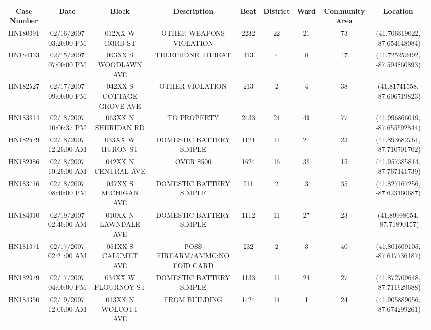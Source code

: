 \documentclass{article} %
\begin{document}
\begin{table}[h]
\centering
\begin{adjustbox}{width=\textwidth}
\begin{tabular}{ccccccccc}
  \hline
Case Number & Date & Block & Description & Beat & District & Ward & Community Area & Location \\ 
  \hline
HN180091 & 02/16/2007 03:20:00 PM & 012XX W 103RD ST & OTHER WEAPONS VIOLATION & 2232 &  22 &  21 &  73 & (41.706819022, -87.654048084) \\ 
  HN184333 & 02/15/2007 07:00:00 PM & 093XX S WOODLAWN AVE & TELEPHONE THREAT & 413 &   4 &   8 &  47 & (41.725252492, -87.594860893) \\ 
  HN182527 & 02/17/2007 09:00:00 PM & 042XX S COTTAGE GROVE AVE & OTHER VIOLATION & 213 &   2 &   4 &  38 & (41.81741558, -87.606719823) \\ 
  HN183814 & 02/18/2007 10:06:37 PM & 063XX N SHERIDAN RD & TO PROPERTY & 2433 &  24 &  49 &  77 & (41.996866019, -87.655592844) \\ 
  HN182579 & 02/18/2007 12:20:00 AM & 033XX W HURON ST & DOMESTIC BATTERY SIMPLE & 1121 &  11 &  27 &  23 & (41.893682761, -87.710701702) \\ 
  HN182986 & 02/18/2007 10:20:00 AM & 042XX N CENTRAL AVE & OVER \$500 & 1624 &  16 &  38 &  15 & (41.957385814, -87.767141739) \\ 
  HN183716 & 02/18/2007 08:40:00 PM & 037XX S MICHIGAN AVE & DOMESTIC BATTERY SIMPLE & 211 &   2 &   3 &  35 & (41.827167256, -87.623160687) \\ 
  HN184010 & 02/19/2007 02:40:00 AM & 010XX N LAWNDALE AVE & DOMESTIC BATTERY SIMPLE & 1112 &  11 &  27 &  23 & (41.89998654, -87.71890157) \\ 
  HN181071 & 02/17/2007 02:21:00 AM & 051XX S CALUMET AVE & POSS FIREARM/AMMO:NO FOID CARD & 232 &   2 &   3 &  40 & (41.801609105, -87.617736187) \\ 
  HN182079 & 02/17/2007 04:00:00 PM & 034XX W FLOURNOY ST & DOMESTIC BATTERY SIMPLE & 1133 &  11 &  24 &  27 & (41.872709648, -87.711929688) \\ 
  HN184350 & 02/19/2007 12:00:00 AM & 013XX N WOLCOTT AVE & FROM BUILDING & 1424 &  14 &   1 &  24 & (41.905889056, -87.674299261) \\ 

\end{tabular}
\end{adjustbox}
\end{table}
\end{document}
